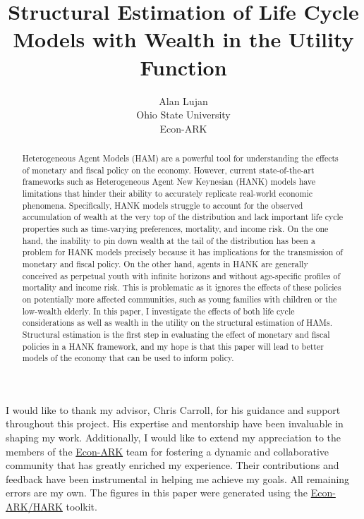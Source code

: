 \documentclass{article}
\title{Structural Estimation of Life Cycle Models with Wealth in the Utility Function}
\date{\displaydate{articleDate}}
\author{Alan Lujan\footnotemark[1]\\
Ohio State University\\Econ-ARK\\}
\begin{document}
\maketitle
{}

\begin{abstract}
Heterogeneous Agent Models (HAM) are a powerful tool for understanding the effects of monetary and fiscal policy on the economy. However, current state-of-the-art frameworks such as Heterogeneous Agent New Keynesian (HANK) models have limitations that hinder their ability to accurately replicate real-world economic phenomena. Specifically, HANK models struggle to account for the observed accumulation of wealth at the very top of the distribution and lack important life cycle properties such as time-varying preferences, mortality, and income risk. On the one hand, the inability to pin down wealth at the tail of the distribution has been a problem for HANK models precisely because it has implications for the transmission of monetary and fiscal policy. On the other hand, agents in HANK are generally conceived as perpetual youth with infinite horizons and without age-specific profiles of mortality and income risk. This is problematic as it ignores the effects of these policies on potentially more affected communities, such as young families with children or the low-wealth elderly. In this paper, I investigate the effects of both life cycle considerations as well as wealth in the utility on the structural estimation of HAMs. Structural estimation is the first step in evaluating the effect of monetary and fiscal policies in a HANK framework, and my hope is that this paper will lead to better models of the economy that can be used to inform policy.
\end{abstract}


I would like to thank my advisor, Chris Carroll, for his guidance and support throughout this project. His expertise and mentorship have been invaluable in shaping my work. Additionally, I would like to extend my appreciation to the members of the \href{https://econ-ark.org/}{Econ-ARK} team for fostering a dynamic and collaborative community that has greatly enriched my experience. Their contributions and feedback have been instrumental in helping me achieve my goals. All remaining errors are my own. The figures in this paper were generated using the \href{https://github.com/econ-ark/HARK}{Econ-ARK/HARK} toolkit.
\end{document}
